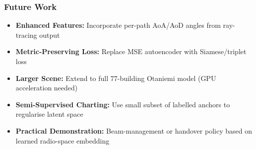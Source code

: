 \documentclass{beamer}
\begin{document}
\begin{frame}
\frametitle{Future Work}
\begin{itemize}
  \item \textbf{Enhanced Features:} Incorporate per-path AoA/AoD angles from ray-tracing output
  \item \textbf{Metric-Preserving Loss:} Replace MSE autoencoder with Siamese/triplet loss
  \item \textbf{Larger Scene:} Extend to full 77-building Otaniemi model (GPU acceleration needed)
  \item \textbf{Semi-Supervised Charting:} Use small subset of labelled anchors to regularise latent space
  \item \textbf{Practical Demonstration:} Beam-management or handover policy based on learned radio-space embedding
\end{itemize}
\end{frame}
\end{document}
